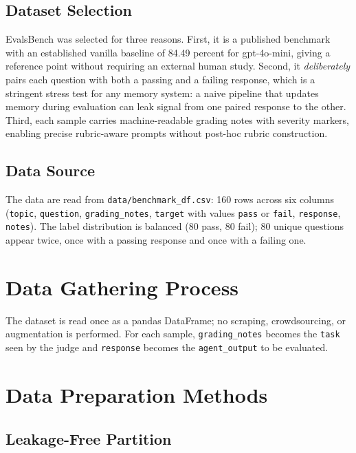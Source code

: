 \documentclass[12pt,a4paper]{report}
\begin{document}
\subsection{Dataset Selection}

EvalsBench was selected for three reasons. First, it is a published benchmark with an established vanilla baseline of 84.49 percent for gpt-4o-mini, giving a reference point without requiring an external human study. Second, it \textit{deliberately} pairs each question with both a passing and a failing response, which is a stringent stress test for any memory system: a naive pipeline that updates memory during evaluation can leak signal from one paired response to the other. Third, each sample carries machine-readable grading notes with severity markers, enabling precise rubric-aware prompts without post-hoc rubric construction.

\subsection{Data Source}

The data are read from \texttt{data/benchmark\_df.csv}: 160 rows across six columns (\texttt{topic}, \texttt{question}, \texttt{grading\_notes}, \texttt{target} with values \texttt{pass} or \texttt{fail}, \texttt{response}, \texttt{notes}). The label distribution is balanced (80 pass, 80 fail); 80 unique questions appear twice, once with a passing response and once with a failing one.

\section{Data Gathering Process}

The dataset is read once as a pandas DataFrame; no scraping, crowdsourcing, or augmentation is performed. For each sample, \texttt{grading\_notes} becomes the \texttt{task} seen by the judge and \texttt{response} becomes the \texttt{agent\_output} to be evaluated.

\section{Data Preparation Methods}
\label{sec:data-preparation}

\subsection{Leakage-Free Partition}
\end{document}

